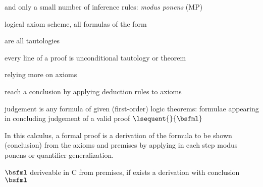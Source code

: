                 \cite{Hodges01ClassicalLogic}

                

                and only a small number of inference rules: \emph{modus ponens} (MP)

                logical axiom scheme, all formulas of the form

                \begin{calculus}
                    \cinferenceRule[L1|$\Lambda1$]{}{
                        \linferenceRule[impl]{
                            \big(\asfml\limply(\bsfml\limply\csfml)\big)
                        }{
                            \big((\asfml\limply\bsfml)\limply(\asfml\limply\csfml)\big)
                        }
                    }{}

                \end{calculus}

                are all tautologies

                
                every line of a proof is unconditional tautology or theorem

                relying more on axioms

                reach a conclusion by applying deduction rules to axioms


                judgement is any formula of given (first-order) logic
                theorems: formulae appearing in concluding judgement of a valid proof $\lsequent{}{\bsfml}$

                In this calculus, a formal proof is a derivation of the formula to be shown (conclusion) from the axioms and premises by applying in each step modus ponens or quantifier-generalization.

                $\bsfml$ deriveable in C from premises, if exists a derivation with conclusion $\bsfml$


